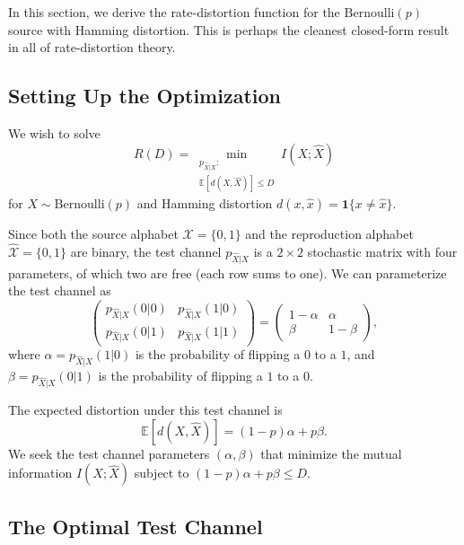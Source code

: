\documentclass[11pt]{article}
\newcommand{\RD}{R(D)}
\newcommand{\Ber}{\mathrm{Bernoulli}}
\newcommand{\E}{\mathbb{E}}
\newcommand{\calX}{\mathcal{X}}
\newcommand{\calXhat}{\hat{\mathcal{X}}}
\begin{document}
In this section, we derive the rate-distortion function for the $\Ber(p)$
source with Hamming distortion.
This is perhaps the cleanest closed-form result in all of rate-distortion theory.

\subsection{Setting Up the Optimization}
\label{subsec:rd_setup}

We wish to solve
\begin{equation}
\label{eq:rd_bernoulli_opt}
\RD = \min_{\substack{p_{\hat{X}|X}: \\ \E[d(X, \hat{X})] \leq D}} I(X; \hat{X})
\end{equation}
for $X \sim \Ber(p)$ and Hamming distortion $d(x, \hat{x}) = \mathbf{1}\{x \neq \hat{x}\}$.

Since both the source alphabet $\calX = \{0, 1\}$ and the reproduction alphabet
$\calXhat = \{0, 1\}$ are binary, the test channel $p_{\hat{X}|X}$ is a $2 \times 2$
stochastic matrix with four parameters, of which two are free (each row sums to one).
We can parameterize the test channel as
\begin{equation}
\label{eq:test_channel_matrix}
\begin{pmatrix}
p_{\hat{X}|X}(0|0) & p_{\hat{X}|X}(1|0) \\
p_{\hat{X}|X}(0|1) & p_{\hat{X}|X}(1|1)
\end{pmatrix}
=
\begin{pmatrix}
1 - \alpha & \alpha \\
\beta & 1 - \beta
\end{pmatrix},
\end{equation}
where $\alpha = p_{\hat{X}|X}(1|0)$ is the probability of flipping a $0$ to a $1$,
and $\beta = p_{\hat{X}|X}(0|1)$ is the probability of flipping a $1$ to a $0$.

The expected distortion under this test channel is
\begin{equation}
\E[d(X, \hat{X})] = (1-p)\alpha + p\beta.
\end{equation}
We seek the test channel parameters $(\alpha, \beta)$ that minimize the mutual
information $I(X; \hat{X})$ subject to $(1-p)\alpha + p\beta \leq D$.

\subsection{The Optimal Test Channel}
\label{subsec:optimal_test_channel}
\end{document}
